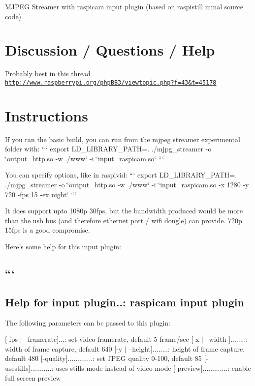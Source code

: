 M\+J\+P\+E\+G Streamer with raspicam input plugin (based on raspistill mmal source code)

\section*{Discussion / Questions / Help }

Probably best in this thread \href{http://www.raspberrypi.org/phpBB3/viewtopic.php?f=43&t=45178}{\tt http\+://www.\+raspberrypi.\+org/php\+B\+B3/viewtopic.\+php?f=43\&t=45178}

\section*{Instructions }

If you ran the basic build, you can run from the mjpeg streamer experimental folder with\+: ``` export L\+D\+\_\+\+L\+I\+B\+R\+A\+R\+Y\+\_\+\+P\+A\+T\+H=. ./mjpg\+\_\+streamer -\/o \char`\"{}output\+\_\+http.\+so -\/w ./www\char`\"{} -\/i \char`\"{}input\+\_\+raspicam.\+so\char`\"{} ```

You can specify options, like in raspivid\+: ``` export L\+D\+\_\+\+L\+I\+B\+R\+A\+R\+Y\+\_\+\+P\+A\+T\+H=. ./mjpg\+\_\+streamer -\/o \char`\"{}output\+\_\+http.\+so -\/w ./www\char`\"{} -\/i \char`\"{}input\+\_\+raspicam.\+so -\/x 1280 -\/y 720 -\/fps 15 -\/ex night\char`\"{} ```

It does support upto 1080p 30fps, but the bandwidth produced would be more than the usb bus (and therefore ethernet port / wifi dongle) can provide. 720p 15fps is a good compromise.

Here's some help for this input plugin\+: \subsection*{``` }

\subsection*{Help for input plugin..\+: raspicam input plugin }

The following parameters can be passed to this plugin\+:

\mbox{[}-\/fps $\vert$ --framerate\mbox{]}...\+: set video framerate, default 5 frame/sec \mbox{[}-\/x $\vert$ --width \mbox{]}........\+: width of frame capture, default 640 \mbox{[}-\/y $\vert$ --height\mbox{]}........\+: height of frame capture, default 480 \mbox{[}-\/quality\mbox{]}.............\+: set J\+P\+E\+G quality 0-\/100, default 85 \mbox{[}-\/usestills\mbox{]}...........\+: uses stills mode instead of video mode \mbox{[}-\/preview\mbox{]}.............\+: enable full screen preview

